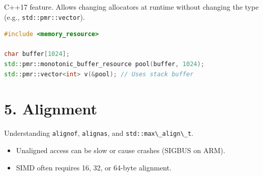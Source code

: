 C++17 feature. Allows changing allocators at runtime without changing
the type (e.g., \passthrough{\lstinline!std::pmr::vector!}).

\begin{lstlisting}[language={C++}]
#include <memory_resource>

char buffer[1024];
std::pmr::monotonic_buffer_resource pool(buffer, 1024);
std::pmr::vector<int> v(&pool); // Uses stack buffer
\end{lstlisting}

\hypertarget{alignment}{%
\section{5. Alignment}\label{alignment}}

Understanding \passthrough{\lstinline!alignof!},
\passthrough{\lstinline!alignas!}, and
\passthrough{\lstinline!std::max\_align\_t!}.

\begin{itemize}
\tightlist
\item
  Unaligned access can be slow or cause crashes (SIGBUS on ARM).
\item
  SIMD often requires 16, 32, or 64-byte alignment.
\end{itemize}
